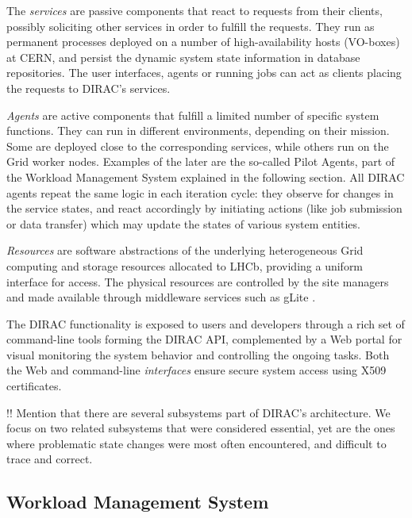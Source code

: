 \documentclass[10pt,conference]{IEEEtran}
\begin{document}
The \textit{services} are passive components that react to requests from their clients,
possibly soliciting other services in order to fulfill the requests. They run as
permanent processes deployed on a number of high-availability hosts (VO-boxes)
at CERN, and persist the dynamic system state information in database
repositories. The user interfaces, agents or running jobs can act as clients
placing the requests to DIRAC’s services.

\textit{Agents} are active components that fulfill a limited number of specific system
functions. They can run in different environments, depending on their mission.
Some are deployed close to the corresponding services, while others run on the
Grid worker nodes.  Examples of the later are the so-called Pilot Agents, part
of the Workload Management System explained in the following section. All DIRAC
agents repeat the same logic in each iteration cycle: they observe for changes
in the service states, and react accordingly by initiating actions (like job
submission or data transfer) which may update the states of various system
entities.

\textit{Resources} are software abstractions of the underlying heterogeneous Grid
computing and storage resources allocated to LHCb, providing a uniform interface
for access. The physical resources are controlled by the site managers and made
available through middleware services such as gLite \cite{gLite}.

The DIRAC functionality is exposed to users and developers through a rich set of
command-line tools forming the DIRAC API, complemented by a Web portal for
visual monitoring the system behavior and controlling the ongoing tasks. Both
the Web and command-line \textit{interfaces} ensure secure system access using X509
certificates.

!! Mention that there are several subsystems part of DIRAC's architecture.
We focus on two related subsystems that were considered essential, yet 
are the ones where problematic state changes were most often encountered, 
and difficult to trace and correct.  

\subsection{Workload Management System}
\end{document}
